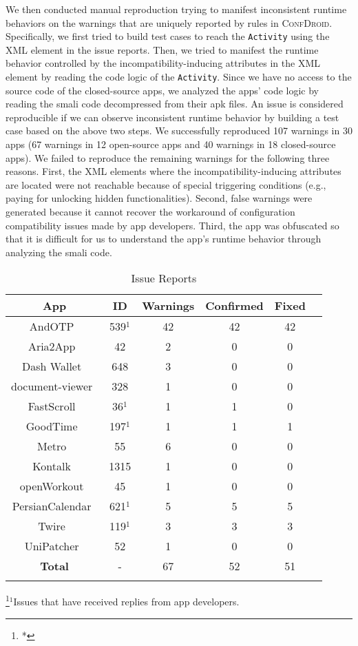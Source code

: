 We then conducted manual reproduction trying to manifest inconsistent runtime behaviors on the warnings that are uniquely reported by rules in \textsc{ConfDroid}.
Specifically, we first tried to build test cases to reach the \texttt{Activity} using the XML element in the issue reports.
Then, we tried to manifest the runtime behavior controlled by the incompatibility-inducing attributes in the XML element by reading the code logic of the \texttt{Activity}.
Since we have no access to the source code of the closed-source apps, we
analyzed the apps' code logic by reading the smali code decompressed from their
apk files.
An issue is considered reproducible if we can observe inconsistent runtime
behavior by building a test case based on the above two steps.
We successfully reproduced 107 warnings in 30 apps (67 warnings in 12 open-source apps and 40 warnings in 18 closed-source apps).
We failed to reproduce the remaining warnings for the following three reasons.
First, the XML elements where the incompatibility-inducing attributes are located were not reachable because of special triggering conditions (e.g., paying for unlocking hidden functionalities).
Second, false warnings were generated because it cannot recover the
workaround of configuration compatibility issues made by app developers.
Third, the app was obfuscated so that it is difficult for us to understand the app's runtime behavior through analyzing the smali code.
\begin{table}[t]
	\caption{{Issue Reports}}
	\centering
	\begin{tabular}{cccccl}
		\toprule
		 {\textbf{App}}   & \textbf{ID} {\centering} & \textbf{Warnings} & \textbf{Confirmed} & \textbf{Fixed} \\ \hline
		AndOTP~\cite{andotp}  & 539$^1$ & 42&42 & 42 \\
		Aria2App~\cite{arial2app} &42& 2& 0& 0\\
		Dash Wallet~\cite{dashwallet} &648& 3&0 &0 \\
		document-viewer~\cite{documentviewer} &328&1 &0 &0 \\
		FastScroll~\cite{androidfastscroll} &36$^1$& 1&1 & 0\\
		GoodTime~\cite{goodtime}  & 197$^1$ &1 & 1 & 1 \\
		Metro~\cite{metro} &55& 6& 0& 0\\
		Kontalk~\cite{kontalk} &1315& 1&0 &0 \\
		openWorkout~\cite{openworkout} &45&1 &0 &0 \\ 
		PersianCalendar~\cite{droidpersiancalendar}  & 621$^1$ &5 & 5 & 5 \\
		Twire~\cite{twire}  & 119$^1$ & 3& 3&3 \\
		UniPatcher~\cite{unipatcher} &52&1 &0 &0 \\ \hline
		\textbf{Total} &-&67 &52 &51 \\
		\bottomrule& 
		\label{tab:issuereport}& & 	\end{tabular}
	\footnote{*}{$^1$Issues that have received replies from app developers.}

\end{table}


